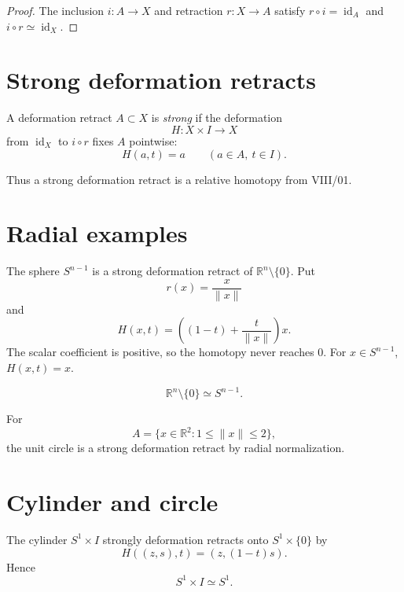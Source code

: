 \begin{proof}
The inclusion \(i:A\to X\) and retraction \(r:X\to A\) satisfy
\(r\circ i=\operatorname{id}_A\) and
\(i\circ r\simeq\operatorname{id}_X\).
\end{proof}

\section{Strong deformation retracts}

\begin{definition}
\label{def:viii02-strong}
A deformation retract \(A\subset X\) is \emph{strong} if the deformation
\[
H:X\times I\to X
\]
from \(\operatorname{id}_X\) to \(i\circ r\) fixes \(A\) pointwise:
\[
H(a,t)=a
\qquad(a\in A,\ t\in I).
\]
\end{definition}

Thus a strong deformation retract is a relative homotopy from VIII/01.

\section{Radial examples}

\begin{example}
\label{ex:viii02-punctured-radial}
The sphere \(S^{n-1}\) is a strong deformation retract of
\(\mathbb R^n\setminus\{0\}\).  Put
\[
r(x)=\frac{x}{\|x\|}
\]
and
\[
H(x,t)=\left((1-t)+\frac{t}{\|x\|}\right)x.
\]
The scalar coefficient is positive, so the homotopy never reaches \(0\).
For \(x\in S^{n-1}\), \(H(x,t)=x\).
\end{example}

\begin{corollary}
\[
\mathbb R^n\setminus\{0\}\simeq S^{n-1}.
\]
\end{corollary}

\begin{example}[Annulus]
\label{ex:viii02-annulus}
For
\[
A=\{x\in\mathbb R^2:1\le\|x\|\le2\},
\]
the unit circle is a strong deformation retract by radial normalization.
\end{example}

\section{Cylinder and circle}

\begin{example}[Cylinder]
\label{ex:viii02-cylinder}
The cylinder \(S^1\times I\) strongly deformation retracts onto
\(S^1\times\{0\}\) by
\[
H((z,s),t)=(z,(1-t)s).
\]
Hence
\[
S^1\times I\simeq S^1.
\]
\end{example}

